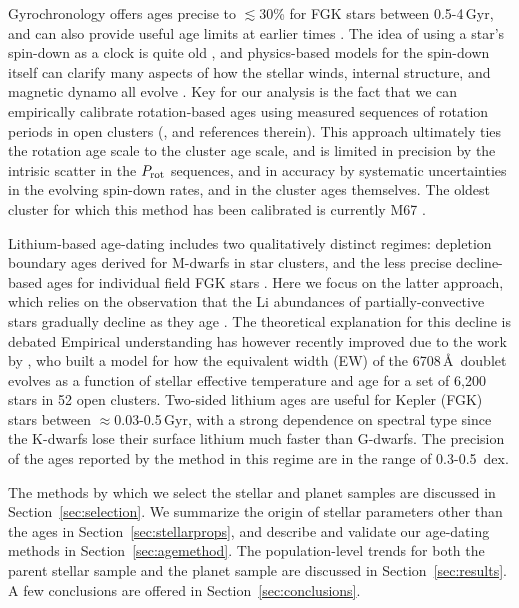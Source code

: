 \documentclass[11pt,twocolumn,tighten]{aastex63}
\begin{document}
Gyrochronology offers ages precise to $\lesssim$30\% for FGK stars
between 0.5-4\,Gyr, and can also provide useful age limits at
earlier times \citep{Bouma_2023}.  The idea of using a star's
spin-down as a clock is quite old
\citep{Skumanich_1972,Noyes_1984,Kawaler_1989,Barnes03,Mamajek_2008,Angus_2015},
and physics-based models for the spin-down itself can clarify many
aspects of how the stellar winds, internal structure, and magnetic
dynamo all evolve
\citep[e.g.][]{Matt_2015,Gallet_Bouvier_2015,Spada_2020}.  Key
for our analysis is the fact that we can empirically calibrate
rotation-based ages using measured sequences of rotation periods
in open clusters
(\citealt{Bouma_2023}, and references therein).  This approach
ultimately ties the rotation age scale to the cluster age scale, and
is limited in precision by the intrisic scatter in the $P_{\rm rot}$
sequences, and in accuracy by systematic uncertainties in the evolving
spin-down rates, and in the cluster ages themselves.
The oldest cluster for which this method has been calibrated is currently
M67 \citep[$\approx$4\,Gyr][]{2022ApJ...938..118D}.

Lithium-based age-dating includes two qualitatively distinct regimes:
depletion boundary ages derived for M-dwarfs in star clusters, and the
less precise decline-based ages for individual field FGK stars
\citep{Soderblom_2010}.  Here we focus on the latter approach, which
relies on the observation that the Li abundances of
partially-convective stars gradually decline as they age
\citep[e.g.][]{2005A&A...442..615S}.  The theoretical explanation for
this decline is debated
\citep[e.g.][]{1995ApJ...441..865C,2010ApJ...716.1269D,2019MNRAS.485.4052C}
Empirical understanding has however recently improved due to the work
by \citet{Jeffries_2023}, who built a model for how the equivalent
width (EW) of the  6708\,\AA\ doublet evolves as a function
of stellar effective temperature and age for a set of 6{,}200 stars in
52 open clusters.  Two-sided lithium ages are useful for Kepler (FGK)
stars between $\approx$0.03-0.5\,Gyr, with a strong dependence on
spectral type since the K-dwarfs lose their surface lithium much
faster than G-dwarfs.  The precision of the ages reported by the
\citet{Jeffries_2023} method in this regime are in the range of
0.3-0.5~dex.

The methods by which we select the stellar and planet samples are 
discussed in Section~\ref{sec:selection}.
We summarize the origin of stellar parameters other than the ages in
Section~\ref{sec:stellarprops}, 
and describe and validate our age-dating methods in
Section~\ref{sec:agemethod}.
The population-level trends for both the parent stellar sample and
the planet sample are discussed in Section~\ref{sec:results}.
A few conclusions are offered in Section~\ref{sec:conclusions}.
\end{document}
